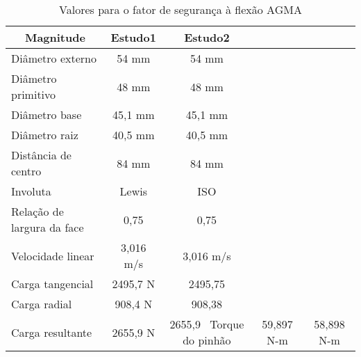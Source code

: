 \begin{table}[]
\centering
\caption{\label{tab:8} Valores para o fator de segurança à flexão AGMA}
\begin{tabular}{l c c c c}
\hline
\multicolumn{1}{c}{\textbf{Magnitude}} & \textbf{Estudo1} & \textbf{Estudo2} \\ \hline
Diâmetro externo              & 54 mm       & 54 mm             \\
Diâmetro primitivo            & 48 mm       & 48 mm             \\
Diâmetro base                 & 45,1 mm     & 45,1 mm           \\
Diâmetro raiz                 & 40,5 mm     & 40,5 mm           \\
Distância de centro           & 84 mm       & 84 mm             \\
Involuta                      & Lewis       & ISO               \\
Relação de largura da face    & 0,75        & 0,75              \\
Velocidade linear             & 3,016 m/s   & 3,016 m/s         \\
Carga tangencial              & 2495,7 N    & 2495,75           \\
Carga radial                  & 908,4 N     & 908,38            \\
Carga resultante              & 2655,9 N    & 2655,9        \
Torque do pinhão              & 59,897 N-m  & 58,898 N-m    \\ \hline
\end{tabular}
\end{table}